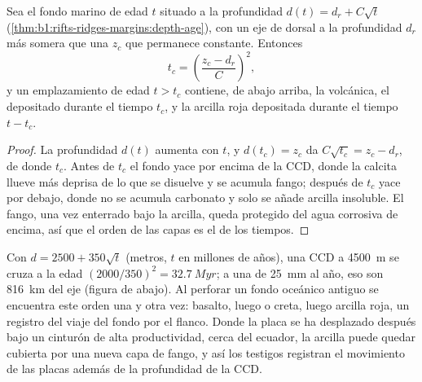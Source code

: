 \begin{proposition}\label{prop:b1:chemical-biogenic-sediments:flank}
Sea el fondo marino de edad $t$ situado a la profundidad $d(t) = d_r + C\sqrt t$
(\cref{thm:b1:rifts-ridges-margins:depth-age}), con un eje de dorsal a la profundidad $d_r$
más somera que una  $z_c$ que permanece constante. Entonces
\[
t_c = \left(\frac{z_c - d_r}{C}\right)^2 ,
\]
y un emplazamiento de edad $t > t_c$ contiene, de abajo arriba, la  volcánica, el  depositado durante el tiempo $t_c$, y la arcilla roja depositada durante el
tiempo $t - t_c$.
\end{proposition}

\begin{proof}
La profundidad $d(t)$ aumenta con $t$, y $d(t_c) = z_c$ da $C\sqrt{t_c} =
z_c - d_r$, de donde $t_c$. Antes de $t_c$ el fondo yace por encima de la CCD, donde la calcita llueve más
deprisa de lo que se disuelve y se acumula fango; después de $t_c$ yace por debajo, donde no se acumula carbonato y solo se añade arcilla insoluble. El fango, una vez enterrado bajo la arcilla,
queda protegido del agua corrosiva de encima, así que el orden de las capas es el de los tiempos.
\end{proof}

Con $d = 2500 + 350\sqrt t$ (metros, $t$ en millones de años), una CCD a \qty{4500}{m} se cruza a la edad $(2000/350)^2 = \qty{32.7}{Myr}$; a una  de \qty{25}{mm} al año, eso son \qty{816}{km} del eje (figura de abajo). Al perforar un fondo oceánico antiguo se encuentra este orden una y otra vez: basalto, luego  o creta,
luego arcilla roja, un registro del viaje del fondo por el flanco. Donde la placa se ha desplazado después bajo un cinturón de alta productividad, cerca del ecuador, la arcilla puede quedar
cubierta por una nueva capa de fango, y así los testigos registran el movimiento de las placas además de la profundidad de la CCD.

